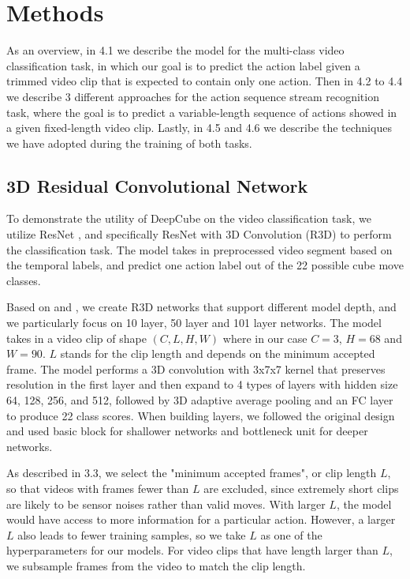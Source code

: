 \documentclass[10pt,twocolumn,letterpaper]{article}
\begin{document}
\section{Methods}
As an overview, in 4.1 we describe the model for the multi-class video classification task, in which our goal is to predict the action label given a trimmed video clip that is expected to contain only one action. Then in 4.2 to 4.4 we describe 3 different approaches for the action sequence stream recognition task, where the goal is to predict a variable-length sequence of actions showed in a given fixed-length video clip. Lastly, in 4.5 and 4.6 we describe the techniques we have adopted during the training of both tasks.

\subsection{3D Residual Convolutional Network}
To demonstrate the utility of DeepCube on the video classification task, we utilize ResNet \cite{resnet}, and specifically ResNet with 3D Convolution (R3D) \cite{r3d} to perform the classification task. The model takes in preprocessed video segment based on the temporal labels, and predict one action label out of the 22 possible cube move classes.

Based on \cite{resnet} and \cite{r3d}, we create R3D networks that support different model depth, and we particularly focus on 10 layer, 50 layer and 101 layer networks. The model takes in a video clip of shape $(C, L, H, W)$ where in our case $C=3$, $H=68$ and $W=90$. $L$ stands for the clip length and depends on the minimum accepted frame. The model performs a 3D convolution with 3x7x7 kernel that preserves resolution in the first layer and then expand to 4 types of layers with hidden size 64, 128, 256, and 512, followed by 3D adaptive average pooling and an FC layer to produce 22 class scores. When building layers, we followed the original design \cite{resnet} and used basic block for shallower networks and bottleneck unit for deeper networks.

As described in 3.3, we select the "minimum accepted frames", or clip length $L$, so that videos with frames fewer than $L$ are excluded, since extremely short clips are likely to be sensor noises rather than valid moves. With larger $L$, the model would have access to more information for a particular action. However, a larger $L$ also leads to fewer training samples, so we take $L$ as one of the hyperparameters for our models. For video clips that have length larger than $L$, we subsample frames from the video to match the clip length.
\end{document}

